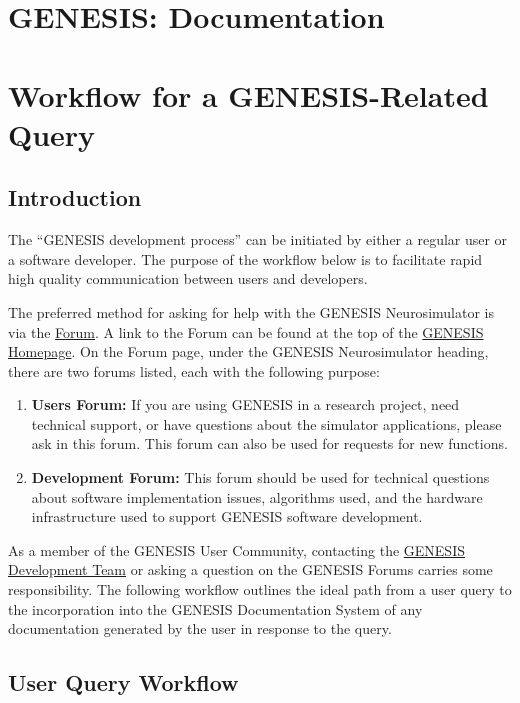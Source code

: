 \documentclass[12pt]{article}
\begin{document}
\section*{GENESIS: Documentation}

\section*{Workflow for a GENESIS-Related Query}

\subsection*{Introduction}

The ``GENESIS development process'' can be initiated by either a
regular user or a software developer. The purpose of the workflow
below is to facilitate rapid high quality communication between users
and developers.

The preferred method for asking for help with the GENESIS
Neurosimulator is via the
\href{http://www.genesis-sim.org/forum}{Forum}.  A link to the Forum
can be found at the top of the
\href{http://www.genesis-sim.org/}{GENESIS Homepage}.  On the Forum
page, under the GENESIS Neurosimulator heading, there are two forums
listed, each with the following purpose:

\begin{enumerate}
\item {\bf Users Forum:} If you are using GENESIS in a research
  project, need technical support, or have questions about the
  simulator applications, please ask in this forum.  This forum can
  also be used for requests for new functions.
\item {\bf Development Forum:} This forum should be used for technical
  questions about software implementation issues, algorithms used, and
  the hardware infrastructure used to support GENESIS software
  development.
\end{enumerate}

As a member of the GENESIS User Community, contacting the
\href{http://www.genesis-sim.org/contact}{GENESIS Development Team} or
asking a question on the GENESIS Forums carries some responsibility. The
following workflow outlines the ideal path from a user query to the
incorporation into the GENESIS Documentation System of any
documentation generated by the user in response to the query.

\subsection*{User Query Workflow}
\end{document}
